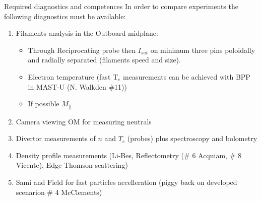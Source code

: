 \documentclass[10pt, compress]{beamer}
\begin{document}
\begin{frame}{Required diagnostics and competences}
In order to compare experiments the following diagnostics must be available: 
\begin{enumerate}
	\item Filaments analysis in the Outboard midplane: 
	\begin{itemize} 
		\item Through Reciprocating probe then $I_{sat}$  on minimum three pins poloidally and radially separated
		 (filaments speed and size). 
		\item Electron temperature (fast T$_e$ measurements
                  can be achieved with BPP in MAST-U {\footnotesize
                    (N. Walkden \#11)})
		\item If possible $M_{\|}$
	 \end{itemize}
	 \item Camera viewing OM for measuring neutrals 
	 \item Divertor measurements of $n$ and $T_e$ (probes) plus
           spectroscopy and bolometry 
	 \item Density profile measurements (Li-Bes, Reflectometry (\#
           6 Acquiam, \# 8 Vicente), Edge Thomson scattering) 
         \item Sami and Field for fast particles accelleration (piggy
           back on developed scenarion \# 4 McClements)
\end{enumerate}
\end{frame}
\end{document}
